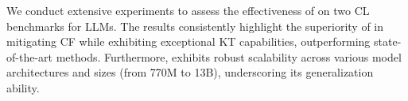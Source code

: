 We conduct extensive experiments to assess the effectiveness of {\ouralg} on two CL benchmarks for LLMs. The results consistently highlight the superiority of {\ouralg} in mitigating CF while exhibiting exceptional KT capabilities, outperforming state-of-the-art methods.
Furthermore, {\ouralg} exhibits robust scalability across various model architectures and sizes (from 770M to 13B), underscoring its generalization ability.

